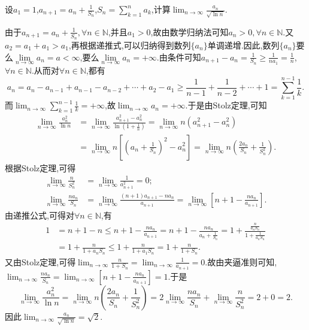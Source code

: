 \documentclass[../../main.tex]{subfiles}
\begin{document}
\begin{example}
设\(a_1 = 1\),\(a_{n + 1} = a_n + \frac{1}{S_n}\),\(S_n = \sum\limits_{k = 1}^{n} a_k\),计算\(\lim_{n \to \infty} \frac{a_n}{\sqrt{\ln n}}\).
\end{example}
\begin{solution}
由于$a_{n + 1} = a_n + \frac{1}{S_n},\forall n\in \mathbb{N}$,并且$a_1>0$,故由数学归纳法可知$a_n>0,\forall n\in \mathbb{N}$.又$a_2=a_1+a_1>a_1$,再根据递推式,可以归纳得到数列$\{a_n\}$单调递增.因此,数列$\{a_n\}$要么$\underset{n\rightarrow \infty}{\lim}a_n=a<\infty $,要么$\underset{n\rightarrow \infty}{\lim}a_n=+\infty $.由条件可知\(a_{n + 1}-a_n=\frac{1}{S_n}\geqslant\frac{1}{na_1}=\frac{1}{n}\),\(\forall n\in\mathbb{N}\).从而对\(\forall n\in\mathbb{N}\),都有
\[
a_n=a_n - a_{n - 1}+a_{n - 1}-a_{n - 2}+\cdots+a_2 - a_1\geqslant\frac{1}{n - 1}+\frac{1}{n - 2}+\cdots+1=\sum_{k = 1}^{n - 1}\frac{1}{k}.
\]
而\(\lim_{n\rightarrow\infty}\sum_{k = 1}^{n - 1}\frac{1}{k}=+\infty\),故\(\lim_{n\rightarrow\infty}a_n=+\infty\).于是由Stolz定理,可知
\begin{align*}
\lim_{n\rightarrow\infty}\frac{a_n^2}{\ln n}&=\lim_{n\rightarrow\infty}\frac{a_{n + 1}^2 - a_n^2}{\ln(1+\frac{1}{n})}=\lim_{n\rightarrow\infty}n(a_{n + 1}^2 - a_n^2)\\
&=\lim_{n\rightarrow\infty}n\left[\left(a_n+\frac{1}{S_n}\right)^2 - a_n^2\right]=\lim_{n\rightarrow\infty}n\left(\frac{2a_n}{S_n}+\frac{1}{S_n^2}\right).
\end{align*}
根据Stolz定理,可得
\begin{align*}
\lim_{n\rightarrow\infty}\frac{n}{S_n^2}&=\lim_{n\rightarrow\infty}\frac{1}{a_{n + 1}^2}=0;\\
\lim_{n\rightarrow\infty}\frac{na_n}{S_n}&=\lim_{n\rightarrow\infty}\frac{(n + 1)a_{n + 1}-na_n}{a_{n + 1}}=\lim_{n\rightarrow\infty}\left[n + 1-\frac{na_n}{a_{n + 1}}\right].
\end{align*}
由递推公式,可得对\(\forall n\in\mathbb{N}\),有
\begin{align*}
1&=n + 1 - n\leqslant n + 1-\frac{na_n}{a_{n + 1}}=n + 1-\frac{na_n}{a_n+\frac{1}{S_n}}=1+\frac{\frac{n}{a_nS_n}}{1+\frac{1}{a_nS_n}}\\
&=1+\frac{n}{1 + a_nS_n}\leqslant1+\frac{n}{1 + a_1S_n}=1+\frac{n}{1 + S_n}.
\end{align*}
又由Stolz定理,可得\(\lim_{n\rightarrow\infty}\frac{n}{1 + S_n}=\lim_{n\rightarrow\infty}\frac{1}{a_{n + 1}}=0\).故由夹逼准则可知,\(\lim_{n\rightarrow\infty}\frac{na_n}{S_n}=\lim_{n\rightarrow\infty}\left[n + 1-\frac{na_n}{a_{n + 1}}\right]=1\).于是
\[
\lim_{n\rightarrow\infty}\frac{a_n^2}{\ln n}=\lim_{n\rightarrow\infty}n\left(\frac{2a_n}{S_n}+\frac{1}{S_n^2}\right)=2\lim_{n\rightarrow\infty}\frac{na_n}{S_n}+\lim_{n\rightarrow\infty}\frac{n}{S_n^2}=2 + 0=2.
\]
因此\(\lim_{n\rightarrow\infty}\frac{a_n}{\sqrt{\ln n}}=\sqrt{2}\).

\end{solution}
\end{document}
